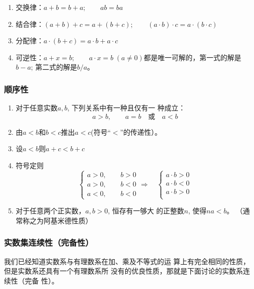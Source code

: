 \begin{enumerate}
    \item 交换律：$a+b=b+a;\qquad  ab=ba$
    \item 结合律：$(a+b)+c=a+(b+c);\qquad (a\cdot b)\cdot c=a\cdot (b\cdot c)$
    \item 分配律：$a\cdot (b+c)=a\cdot b+a\cdot c$
   \item 可逆性：$a+x=b;\qquad a\cdot x=b\; (a\ne 0)$都是唯一可解的，第一式的解是$b-a$; 第二式的解是$b/a$。
\end{enumerate}

\subsubsection{顺序性}
\begin{enumerate}
    \item 对于任意实数$a,b$, 下列关系中有一种且仅有一
    种成立：
    \[a>b,\qquad a=b\quad \text{或}\quad a<b\]
    \item 由$a<b$和$b<c$推出$a<c$(符号“$<$”的传递性）。
    \item 设$a<b$则$a+c<b+c$
    \item 符号定则
    \[\begin{cases}
        a>0,\qquad b>0\\
        a>0,\qquad b<0\\
        a<0,\qquad b<0
    \end{cases}\Rightarrow\quad  \begin{cases}
        a\cdot b>0\\a\cdot b<0\\a\cdot b>0\\
    \end{cases}\]
    \item 对于任意两个正实数，$a,b>0$, 恒存有一够大
    的正整数$n$, 使得$na<b$。 （通常称之为阿基米德性质）
\end{enumerate}

\subsubsection{ 实数集连续性（完备性）}
我们已经知道实数系与有理数系在加、乘及不等式的运
算上有完全相同的性质，但是实数系还具有一个有理数系所
没有的优良性质，那就是下面讨论的实数系连续性（完备
性）。

